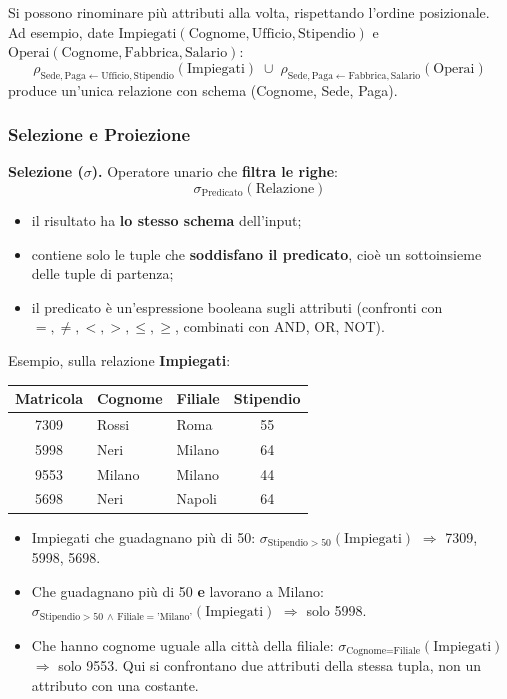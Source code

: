 \documentclass[12pt]{extarticle}
\begin{document}
\medskip
\noindent Si possono rinominare più attributi alla volta, rispettando l'ordine posizionale. Ad esempio, date $\text{Impiegati}(\text{Cognome}, \text{Ufficio}, \text{Stipendio})$ e $\text{Operai}(\text{Cognome}, \text{Fabbrica}, \text{Salario})$:
\[
\rho_{\text{Sede}, \text{Paga} \leftarrow \text{Ufficio}, \text{Stipendio}}(\text{Impiegati}) \;\cup\; \rho_{\text{Sede}, \text{Paga} \leftarrow \text{Fabbrica}, \text{Salario}}(\text{Operai})
\]
produce un'unica relazione con schema (Cognome, Sede, Paga).

\subsubsection{Selezione e Proiezione}
\noindent \textbf{Selezione ($\sigma$).} Operatore unario che \textbf{filtra le righe}:
\[
\sigma_{\text{Predicato}}(\text{Relazione})
\]
\begin{itemize}
    \item il risultato ha \textbf{lo stesso schema} dell'input;
    \item contiene solo le tuple che \textbf{soddisfano il predicato}, cioè un sottoinsieme delle tuple di partenza;
    \item il predicato è un'espressione booleana sugli attributi (confronti con $=, \neq, <, >, \leq, \geq$, combinati con AND, OR, NOT).
\end{itemize}

\noindent Esempio, sulla relazione \textbf{Impiegati}:
\begin{center}
\small
\begin{tabular}{cllc}
    \toprule
    \textbf{Matricola} & \textbf{Cognome} & \textbf{Filiale} & \textbf{Stipendio} \\
    \midrule
    7309 & Rossi & Roma & 55 \\
    5998 & Neri & Milano & 64 \\
    9553 & Milano & Milano & 44 \\
    5698 & Neri & Napoli & 64 \\
    \bottomrule
\end{tabular}
\end{center}
\begin{itemize}
    \item Impiegati che guadagnano più di 50: $\sigma_{\text{Stipendio} > 50}(\text{Impiegati})$ $\Rightarrow$ 7309, 5998, 5698.
    \item Che guadagnano più di 50 \textbf{e} lavorano a Milano: $\sigma_{\text{Stipendio} > 50 \,\wedge\, \text{Filiale} = \text{'Milano'}}(\text{Impiegati})$ $\Rightarrow$ solo 5998.
    \item Che hanno cognome uguale alla città della filiale: $\sigma_{\text{Cognome} = \text{Filiale}}(\text{Impiegati})$ $\Rightarrow$ solo 9553. Qui si confrontano due attributi della stessa tupla, non un attributo con una costante.
\end{itemize}
\end{document}
